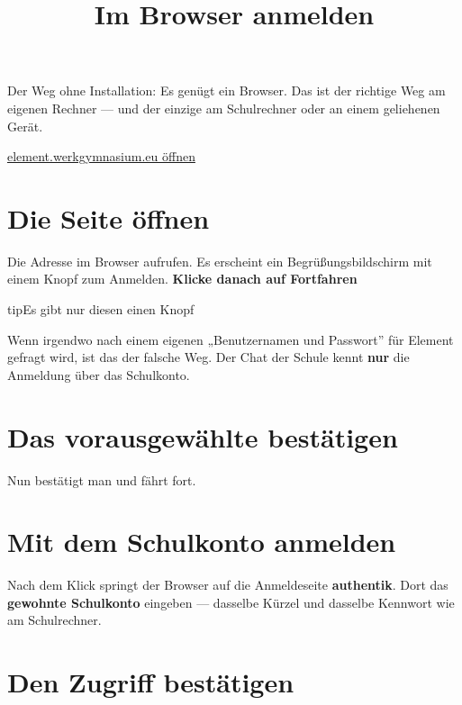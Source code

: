 \documentclass[11pt,parskip=half]{scrartcl}
\title{Im Browser anmelden}
\date{}
\author{}
\begin{document}
\maketitle

Der Weg ohne Installation: Es genügt ein Browser. Das ist der richtige Weg am
eigenen Rechner — und der einzige am Schulrechner oder an einem geliehenen
Gerät.

\href{https://element.werkgymnasium.eu}{element.werkgymnasium.eu öffnen}

\section{Die Seite öffnen}

Die Adresse  im Browser aufrufen. Es erscheint ein
Begrüßungsbildschirm mit einem Knopf zum Anmelden. \textbf{Klicke danach auf Fortfahren}


\begin{kasten}{tip}{Es gibt nur diesen einen Knopf}

Wenn irgendwo nach einem eigenen „Benutzernamen und Passwort” für Element
gefragt wird, ist das der falsche Weg. Der Chat der Schule kennt \textbf{nur} die
Anmeldung über das Schulkonto.

\end{kasten}

\section{Das vorausgewählte bestätigen}

Nun bestätigt man und fährt fort.


\section{Mit dem Schulkonto anmelden}

Nach dem Klick springt der Browser auf die Anmeldeseite \textbf{authentik}. Dort das \textbf{gewohnte Schulkonto} eingeben — dasselbe Kürzel und dasselbe Kennwort wie am Schulrechner.


\section{Den Zugriff bestätigen}
\end{document}
